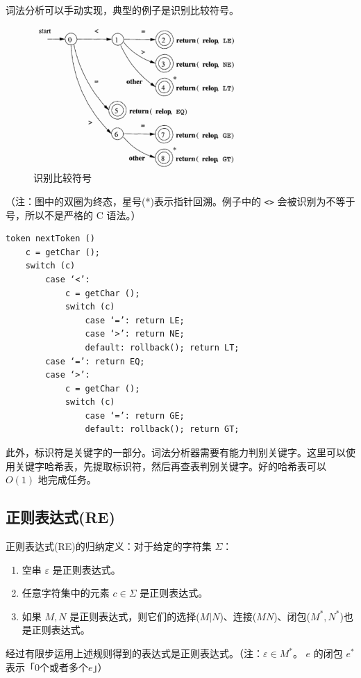 \documentclass[UTF8]{ctexart}
\newcommand\Emph[1]{\textcolor{cyan!80!black}{#1}}
\newcommand\Notes[1]{\textcolor{yellow!50!black}{\small #1}}
\begin{document}
词法分析可以手动实现，典型的例子是识别比较符号。

\begin{figure}[htb]
  \centering
  \includegraphics[width=8cm]{识别比较符号.png}
  \caption{识别比较符号}\label{fig:compare}
\end{figure}

\Notes{（注：图中的双圈为终态，星号(*)表示指针回溯。例子中的 \texttt{<>} 会被识别为不等于号，所以不是严格的 C 语法。）}

\begin{lstlisting}
token nextToken ()
    c = getChar ();
    switch (c)
        case ‘<’:
            c = getChar ();
            switch (c)
                case ‘=’: return LE;
                case ‘>’: return NE;
                default: rollback(); return LT;
        case ‘=’: return EQ;
        case ‘>’:
            c = getChar ();
            switch (c)
                case ‘=’: return GE;
                default: rollback(); return GT;
\end{lstlisting}

此外，标识符是关键字的一部分。词法分析器需要有能力判别关键字。这里可以使用\Emph{关键字哈希表}，先提取标识符，然后再查表判别关键字。好的哈希表可以 $O(1)$ 地完成任务。

\subsection{正则表达式(RE)}
\Emph{正则表达式(RE)}的归纳定义：对于给定的字符集 $\varSigma$：
\begin{enumerate}[itemsep=0pt,parsep=0pt,leftmargin=1.5cm]
  \item 空串 $\varepsilon$ 是正则表达式。
  \item 任意字符集中的元素 $c\in\varSigma$ 是正则表达式。
  \item 如果 $M,N$ 是正则表达式，则它们的选择($M|N$)、连接($MN$)、闭包($M^*,N^*$)也是正则表达式。
\end{enumerate}
经过有限步运用上述规则得到的表达式是正则表达式。\Notes{（注：$\varepsilon\in M^*$。 $e$ 的闭包 $e^*$ 表示「0个或者多个$e$」）}
\end{document}
